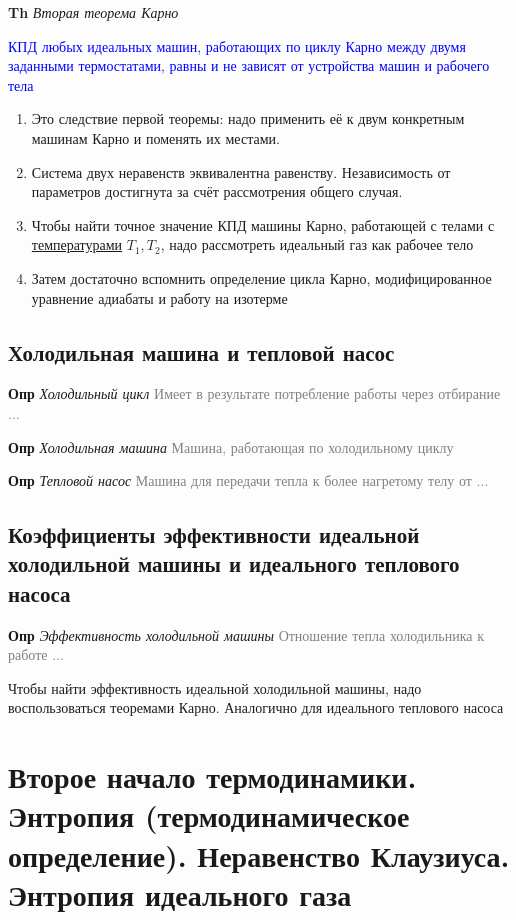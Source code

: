 \documentclass[a4paper, 14pt]{article}
\begin{document}
    \textbf{Th} \textit{Вторая теорема Карно}
    
    \textcolor{blue}{КПД любых идеальных машин, работающих по циклу Карно между двумя заданными термостатами, равны и
    не зависят от устройства машин и рабочего тела}
    
    \begin{enumerate}
        \item Это следствие первой теоремы: надо применить её к двум конкретным машинам Карно и поменять их местами.
        \item Система двух неравенств эквивалентна равенству.
        Независимость от параметров достигнута за счёт рассмотрения общего случая.
        \item Чтобы найти точное значение КПД машины Карно, работающей с телами с \underline{температурами} $T_1, T_2$,
        надо рассмотреть идеальный газ как рабочее тело
        \item Затем достаточно вспомнить определение цикла Карно, модифицированное уравнение адиабаты и работу на
        изотерме
    \end{enumerate}
    
    \subsection{Холодильная машина и тепловой насос}
    
    \textbf{Опр} \textit{Холодильный цикл} \textcolor{gray}{Имеет в результате потребление работы через отбирание ...}
    
    \textbf{Опр} \textit{Холодильная машина} \textcolor{gray}{Машина, работающая по холодильному циклу}
    
    \textbf{Опр} \textit{Тепловой насос} \textcolor{gray}{Машина для передачи тепла к более нагретому телу от ...}
    
    \subsection{Коэффициенты эффективности идеальной холодильной машины и идеального теплового насоса}
    
    \textbf{Опр} \textit{Эффективность холодильной машины} \textcolor{gray}{Отношение тепла холодильника к работе ...}
    
    Чтобы найти эффективность идеальной холодильной машины, надо воспользоваться теоремами Карно.
    Аналогично для идеального теплового насоса
    
    \section{Второе начало термодинамики.
    Энтропия (термодинамическое определение).
    Неравенство Клаузиуса.
    Энтропия идеального газа}
    
\end{document}
